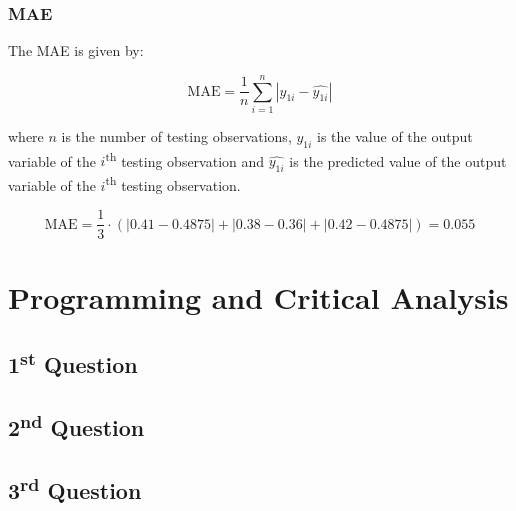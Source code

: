 \documentclass{article}
\begin{document}
\subsubsection*{MAE}

The MAE is given by:

\[ \text{MAE} = \frac{1}{n} \sum_{i=1}^{n} |y_{1i} - \hat{y_{1i}}| \]

where $n$ is the number of testing observations, $y_{1i}$ is the value of the output variable of the $i$\textsuperscript{th} testing observation and $\hat{y_{1i}}$ is the predicted value of the output variable of the $i$\textsuperscript{th} testing observation.

\[ \text{MAE} = \frac{1}{3} \cdot (|0.41 - 0.4875| + |0.38 - 0.36| + |0.42 - 0.4875|) = 0.055 \]

\newpage

\section*{Programming and Critical Analysis}

\subsection*{1\textsuperscript{st} Question}

\subsection*{2\textsuperscript{nd} Question}

\subsection*{3\textsuperscript{rd} Question}
\end{document}
